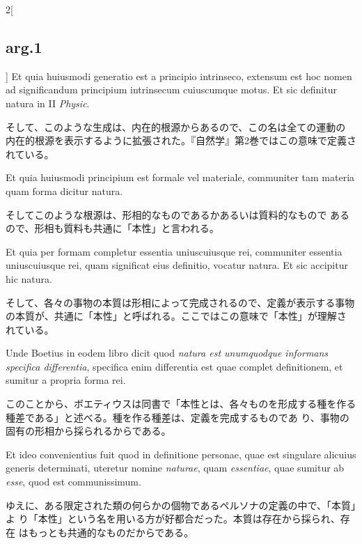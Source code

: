 \documentclass[paper=a4paper,fontsize=10pt,jafontsize=9pt,titlepage]{jlreq}
\begin{document}
\begin{paracol}{2}[\subsection{arg.1}]
Et quia huiusmodi generatio est a principio
intrinseco, extensum est hoc nomen ad significandum principium
intrinsecum cuiuscumque motus. Et sic definitur natura in II {\itshape Physic}.

\switchcolumn

そして、このような生成は、内在的根源からあるので、この名は全ての運動の
 内在的根源を表示するように拡張された。『自然学』第2巻ではこの意味で定義されている。

\switchcolumn*

Et
quia huiusmodi principium est formale vel materiale, communiter tam
materia quam forma dicitur natura.

\switchcolumn

そしてこのような根源は、形相的なものであるかあるいは質料的なもので
 あるので、形相も質料も共通に「本性」と言われる。

\switchcolumn*

Et quia per formam completur essentia
uniuscuiusque rei, communiter essentia uniuscuiusque rei, quam
significat eius definitio, vocatur natura. Et sic accipitur hic
natura.

\switchcolumn

そして、各々の事物の本質は形相によって完成されるので、定義が表示する事物
 の本質が、共通に「本性」と呼ばれる。ここではこの意味で「本性」が理解さ
 れている。

\switchcolumn*

Unde Boetius in eodem libro dicit quod {\itshape natura est unumquodque
informans specifica differentia}, specifica enim differentia est quae
complet definitionem, et sumitur a propria forma rei.

\switchcolumn

このことから、ボエティウスは同書で「本性とは、各々ものを形成する種を作る
 種差である」と述べる。種を作る種差は、定義を完成するものであ
 り、事物の固有の形相から採られるからである。

\switchcolumn*

Et ideo
convenientius fuit quod in definitione personae, quae est singulare
alicuius generis determinati, uteretur nomine {\itshape naturae}, quam {\itshape essentiae},
quae sumitur ab {\itshape esse}, quod est communissimum.

\switchcolumn

ゆえに、ある限定された類の何らかの個物であるペルソナの定義の中で、「本質」よ
 り「本性」という名を用いる方が好都合だった。本質は存在から採られ、存在
 はもっとも共通的なものだからである。

\switchcolumn*[\subsection{ad.5}]


\end{paracol}
\end{document}

